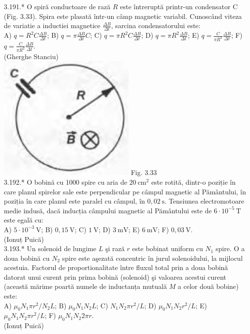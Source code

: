 3.191.* O spiră conductoare de rază $R$ este întreruptă printr-un condensator C (Fig. 3.33). Spira este plasată într-un câmp magnetic variabil. Cunoscând viteza de variatie a inductiei magnetice $\frac{\Delta B}{\Delta t}$, sarcina condensatorului este:\\ A) $q=R^{2} C \frac{\Delta B}{\Delta t}$; B) $q=\pi \frac{\Delta B}{\Delta t} C$; C) $q=\pi R^{2} C \frac{\Delta B}{\Delta t}$; D) $q=\pi R^{2} \frac{\Delta B}{\Delta t}$; E) $q=\frac{C}{\pi R^{2}} \frac{\Delta B}{\Delta t}$; F) $q=\frac{C}{\pi R^{2}} \frac{\Delta B}{\Delta t}$.\\ (Gherghe Stanciu)\\ \includegraphics[width=0.4\linewidth]{images/2025_07_01_5b3ff9fa0d508c8e9f17g-188} Fig. 3.33\\

3.192.* O bobină cu 1000 spire cu aria de $20 \mathrm{~cm}^{2}$ este rotită, dintr-o poziție în care planul spirelor sale este perpendicular pe câmpul magnetic al Pământului, în poziția în care planul este paralel cu câmpul, în $0,02 \mathrm{~s}$. Tensiunea electromotoare medie indusă, dacă inducția câmpului magnetic al Pământului este de $6 \cdot 10^{-5} \mathrm{~T}$ este egală cu:\\ A) $5 \cdot 10^{-3} \mathrm{~V}$; B) $0,15 \mathrm{~V}$; C) $1 \mathrm{~V}$; D) $3 \mathrm{~mV}$; E) $6 \mathrm{~mV}$; F) $0,03 \mathrm{~V}$.\\ (Ionuț Puică)\\

3.193.* Un solenoid de lungime $L$ şi rază $r$ este bobinat uniform cu $N_{1}$ spire. O a doua bobină cu $N_{2}$ spire este aşezată concentric în jurul solenoidului, la mijlocul acestuia. Factorul de proportionalitate între fluxul total prin a doua bobină datorat unui curent prin prima bobină (solenoid) şi valoarea acestui curent (această mărime poartă numele de inductanța mutuală $M$ a celor două bobine) este:\\ A) $\mu_{0} N_{1} \pi r^{2} / N_{2} L$; B) $\mu_{0} N_{1} N_{2} L$; C) $N_{1} N_{2} \pi r^{2} / L$; D) $\mu_{0} N_{1} N_{2} r^{2} / L$; E) $\mu_{0} N_{1} N_{2} \pi r^{2} / L$; F) $\mu_{0} N_{1} N_{2} 2 \pi r$.\\ (Ionuț Puică)\\

